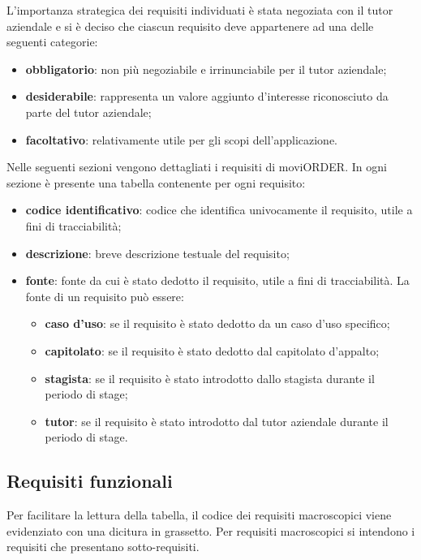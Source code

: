 L'importanza strategica dei requisiti individuati è stata negoziata con il tutor aziendale e si è deciso che ciascun requisito deve appartenere ad una delle seguenti categorie:
\begin{itemize}
	\item \textbf{obbligatorio}: non più negoziabile e irrinunciabile per il tutor aziendale;
	\item \textbf{desiderabile}: rappresenta un valore aggiunto d'interesse riconosciuto da parte del tutor aziendale;
	\item \textbf{facoltativo}: relativamente utile per gli scopi dell'applicazione.
\end{itemize}

Nelle seguenti sezioni vengono dettagliati i requisiti di moviORDER. In ogni sezione è presente una tabella contenente per ogni requisito:
\begin{itemize}
	\item \textbf{codice identificativo}: codice che identifica univocamente il requisito, utile a fini di tracciabilità;
	\item \textbf{descrizione}: breve descrizione testuale del requisito;
	\item \textbf{fonte}: fonte da cui è stato dedotto il requisito, utile a fini di tracciabilità. La fonte di un requisito può essere:
		\begin{itemize}
			\item \textbf{caso d'uso}: se il requisito è stato dedotto da un caso d'uso specifico;
			\item \textbf{capitolato}: se il requisito è stato dedotto dal capitolato d'appalto;
			\item \textbf{stagista}: se il requisito è stato introdotto dallo stagista durante il periodo di stage;
			\item \textbf{tutor}: se il requisito è stato introdotto dal tutor aziendale durante il periodo di stage.
		\end{itemize}
\end{itemize}

\newpage

\subsection{Requisiti funzionali}

Per facilitare la lettura della tabella, il codice dei requisiti macroscopici viene evidenziato con una dicitura in grassetto. Per requisiti macroscopici si intendono i requisiti che presentano sotto-requisiti.

